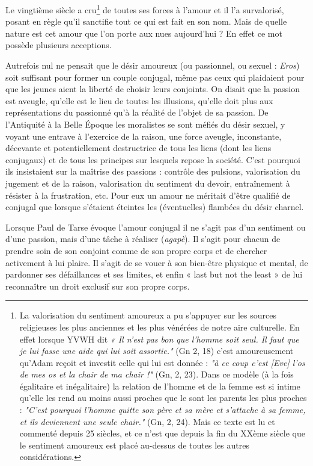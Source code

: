 Le vingtième siècle a cru\footnote{La valorisation du sentiment amoureux a pu s'appuyer sur les sources religieuses les plus anciennes et les plus vénérées de notre aire culturelle. En effet lorsque YVWH dit \emph{« Il n'est pas bon que l'homme soit seul. Il faut que je lui fasse une aide qui lui soit assortie."} (Gn 2, 18) c'est amoureusement qu'Adam reçoit et investit celle qui lui est donnée : \emph{"à ce coup c'est [Eve] l'os de mes os et la chair de ma chair !"} (Gn, 2, 23). Dans ce modèle (à la fois égalitaire et inégalitaire) la relation de l’homme et de la femme est si intime qu'elle les rend au moins aussi proches que le sont les parents les plus proches : \emph{"C'est pourquoi l'homme quitte son père et sa mère et s'attache à sa femme, et ils deviennent une seule chair."} (Gn, 2, 24). Mais ce texte est lu et commenté depuis 25 siècles, et ce n'est que depuis la fin du XXème siècle que le sentiment amoureux est placé au-dessus de toutes les autres considérations.} de toutes ses forces à l’amour et il l'a survalorisé, posant en règle qu'il sanctifie tout ce qui est fait en son nom.
Mais de quelle nature est cet amour que l'on porte aux nues aujourd'hui ? En effet ce mot possède plusieurs acceptions. 

Autrefois nul ne pensait que le désir amoureux (ou passionnel, ou sexuel : \emph{Eros}) soit suffisant pour former un couple conjugal, même pas ceux qui plaidaient pour que les jeunes aient la liberté de choisir leurs conjoints. On disait que la passion est aveugle, qu'elle est le lieu de toutes les illusions, qu'elle doit plus aux représentations du passionné qu’à la réalité de l’objet de sa passion. De l'Antiquité à la Belle Époque les moralistes se sont méfiés du désir sexuel, y voyant une entrave à l'exercice de la raison, une force aveugle, inconstante, décevante et potentiellement destructrice de tous les liens (dont les liens conjugaux) et de tous les principes sur lesquels repose la société. C'est pourquoi ils insistaient sur la maîtrise des passions : contrôle des pulsions, valorisation du jugement et de la raison, valorisation du sentiment du devoir, entraînement à résister à la frustration, etc. Pour eux un amour ne méritait d'être qualifié de conjugal que lorsque s'étaient éteintes les (éventuelles) flambées du désir charnel. 

Lorsque Paul de Tarse évoque l'amour conjugal il ne s'agit pas d'un sentiment ou d'une passion, mais d'une tâche à réaliser (\emph{agapè}). Il s'agit pour chacun de prendre soin de son conjoint comme de son propre corps et de chercher activement à lui plaire. Il s'agit de se vouer à son bien-être physique et mental, de pardonner ses défaillances et ses limites, et enfin « last but not the least » de lui reconnaître un droit exclusif sur son propre corps. 

